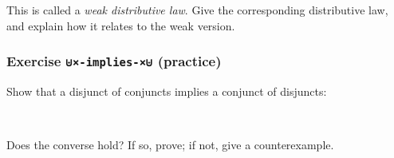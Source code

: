 This is called a \emph{weak distributive law}. Give the corresponding
distributive law, and explain how it relates to the weak version.

\begin{fence}
\begin{code}%
\>[0]\<%
\end{code}
\end{fence}

\hypertarget{exercise--implies--practice}{%
\subsubsection{\texorpdfstring{Exercise \texttt{⊎×-implies-×⊎}
(practice)}{Exercise ⊎×-implies-×⊎ (practice)}}\label{exercise--implies--practice}}

Show that a disjunct of conjuncts implies a conjunct of disjuncts:

\begin{fence}
\begin{code}%
\>[0]\<%
\\
\>[0][@{}l@{\AgdaIndent{0}}]%
\>[2]\AgdaSpace{}%
\AgdaSymbol{:}\AgdaSpace{}%
\AgdaSpace{}%
\AgdaSymbol{\{}\AgdaSpace{}%
\AgdaSpace{}%
\AgdaSpace{}%
\AgdaSpace{}%
\AgdaSymbol{:}\AgdaSpace{}%
\AgdaSymbol{\}}\AgdaSpace{}%
\AgdaSpace{}%
\AgdaSymbol{(}\AgdaSpace{}%
\AgdaSpace{}%
\AgdaSymbol{)}\AgdaSpace{}%
\AgdaSpace{}%
\AgdaSymbol{(}\AgdaSpace{}%
\AgdaSpace{}%
\AgdaSymbol{)}\AgdaSpace{}%
\AgdaSpace{}%
\AgdaSymbol{(}\AgdaSpace{}%
\AgdaSpace{}%
\AgdaSymbol{)}\AgdaSpace{}%
\AgdaSpace{}%
\AgdaSymbol{(}\AgdaSpace{}%
\AgdaSpace{}%
\AgdaSymbol{)}\<%
\end{code}
\end{fence}

Does the converse hold? If so, prove; if not, give a counterexample.

\begin{fence}
\begin{code}%
\>[0]\<%
\end{code}
\end{fence}

